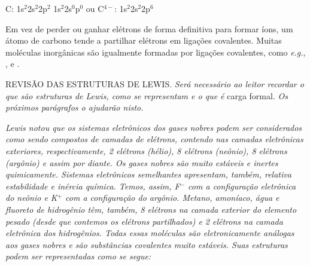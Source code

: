\begin{tightcenter}
    C: 1s$^2$2s$^2$2p$^2$ \ch{->} 1s$^2$2s$^0$p$^0$ ou C$^{4-}$: 1s$^2$2s$^2$2p$^6$
\end{tightcenter}

Em vez de perder ou ganhar elétrons de forma definitiva para formar íons, um átomo de carbono tende a partilhar elétrons em ligações covalentes. Muitas moléculas inorgânicas são igualmente formadas por ligações covalentes, como \textit{e.g.}, ,  e . 

\par\bigskip
\noindent REVISÃO DAS ESTRUTURAS DE LEWIS. \textit{Será necessário ao leitor recordar o que são estruturas de Lewis, como se representam e o que é} carga formal. \textit{Os próximos parágrafos o ajudarão nisto.} 

\emph{Lewis notou que os sistemas eletrônicos dos gases nobres podem ser considerados como sendo compostos de camadas de elétrons, contendo nas camadas eletrônicas exteriores, respectivamente, 2 elétrons (hélio), 8 elétrons (neônio), 8 elétrons (argônio) e assim por diante. Os gases nobres são muito estáveis e inertes quimicamente. Sistemas eletrônicos semelhantes apresentam, também, relativa estabilidade e inércia química. Temos, assim, F$^-$ com a configuração eletrônica do neônio e K$^+$ com a configuração do argônio. Metano, amoníaco, água e fluoreto de hidrogênio têm, também, 8 elétrons na camada exterior do elemento pesado (desde que contemos os elétrons partilhados) e 2 elétrons na camada eletrônica dos hidrogênios. Todas essas moléculas são eletronicamente análogas aos gases nobres e são substâncias covalentes muito estáveis. Suas estruturas podem ser representadas como se segue:}

\begin{tightcenter}
    \chemnameinit{}
    \qquad    
    \chemnameinit{}
    \qquad    
    \chemnameinit{}
    \qquad\qquad\qquad    
    \chemnameinit{}
    \qquad\qquad\qquad    
    \chemnameinit{}
    \qquad    
    \chemnameinit{}
\end{tightcenter}

